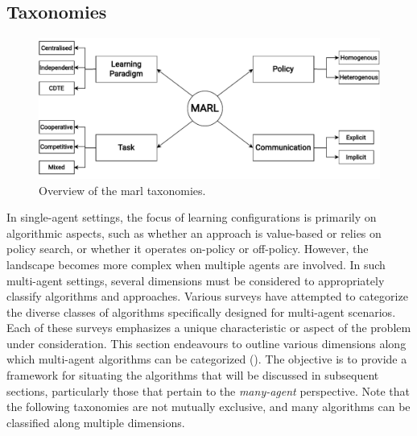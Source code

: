 \subsection{Taxonomies}
\begin{figure}
  \includegraphics[width=\textwidth]{chapters/img/marl-taxonomy.drawio.pdf}
  \caption{Overview of the \ac{marl} taxonomies.}\label{fig:marl:taxonomy}
\end{figure}
In single-agent settings, the focus of learning configurations is primarily on algorithmic aspects, 
 such as whether an approach is value-based or relies on policy search, or whether it operates on-policy or off-policy. 
%
However, the landscape becomes more complex when multiple agents are involved. 
In such multi-agent settings, 
 several dimensions must be considered to appropriately classify algorithms and approaches. 
Various surveys have attempted to categorize the diverse classes of algorithms specifically designed for multi-agent scenarios. 
Each of these surveys emphasizes a unique characteristic or aspect of the problem under consideration. 
%
This section endeavours to outline various dimensions along which multi-agent algorithms can be categorized (). 
 The objective is to provide a framework for situating the algorithms that will be discussed in subsequent sections, 
 particularly those that pertain to the \emph{many-agent} perspective.
Note that the following taxonomies are not mutually exclusive, 
 and many algorithms can be classified along multiple dimensions.
